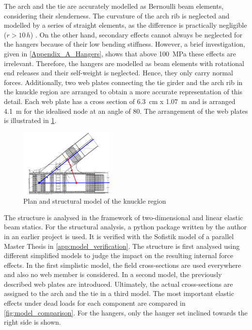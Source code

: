 The arch and the tie are accurately modelled as Bernoulli beam elements, considering their slenderness. The curvature of the arch rib is neglected and modelled by a series of straight elements, as the difference is practically negligible ($r>10\,h$) \cite{MARTI}. On the other hand, secondary effects cannot always be neglected for the hangers because of their low bending stiffness. However, a brief investigation, given in \cref{Appendix_A_Hangers}, shows that above \SI{100}{MPa} these effects are irrelevant. Therefore, the hangers are modelled as beam elements with rotational end releases and their self-weight is neglected. Hence, they only carry normal forces. Additionally, two web plates connecting the tie girder and the arch rib in the knuckle region are arranged to obtain a more accurate representation of this detail. Each web plate has a cross section of \SI{6.3}{cm} x \SI{1.07}{m} and is arranged \SI{4.1}{m} for the idealised node at an angle of 80\degree. The arrangement of the web plates is illustrated in \cref{fig:knuckle_region}.


\begin{figure}[H]
    \centering
    \includegraphics[width=0.42\textwidth]{overleaf/Pictures/Knuckle region.png}
    \caption{Plan and structural model of the knuckle region}
    \label{fig:knuckle_region}
\end{figure}

The structure is analysed in the framework of two-dimensional and linear elastic beam statics. For the structural analysis, a python package written by the author in an earlier project is used. It is verified with the Sofistik model of a parallel Master Thesis in \cref{app:model_verification}. The structure is first analysed using different simplified models to judge the impact on the resulting internal force effects. In the first simplistic model, the field cross-sections are used everywhere and also no web member is considered. In a second model, the previously described web plates are introduced. Ultimately, the actual cross-sections are assigned to the arch and the tie in a third model. The most important elastic effects under dead loads for each component are compared in \cref{fig:model_comparison}. For the hangers, only the hanger set inclined towards the right side is shown.

